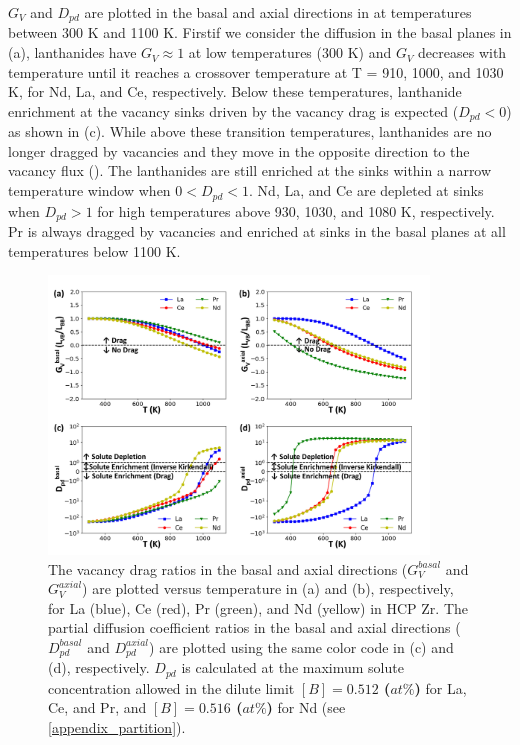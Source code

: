 \documentclass[preprint,12pt]{elsarticle}
\providecommand{\DIFadd}[1]{{\bf #1}} %
\providecommand{\DIFdel}[1]{} %
\providecommand{\DIFaddbegin}{\protect\color{blue}} %
\providecommand{\DIFaddend}{\protect\color{black}} %
\providecommand{\DIFdelbegin}{\protect\color{red}} %
\providecommand{\DIFdelend}{\protect\color{black}} %
\providecommand{\DIFaddFL}[1]{\DIFadd{#1}} %
\providecommand{\DIFdelFL}[1]{\DIFdel{#1}} %
\providecommand{\DIFaddbeginFL}{} %
\providecommand{\DIFaddendFL}{} %
\providecommand{\DIFdelbeginFL}{} %
\providecommand{\DIFdelendFL}{} %
\newcommand{\DIFscaledelfig}{0.5}
\newlength{\DIFdelgraphicswidth} %
\newlength{\DIFdelgraphicsheight} %
\newcommand{\DIFaddincludegraphics}[2][]{{\color{blue}\fbox{\DIFOincludegraphics[#1]{#2}}}} %
\newcommand{\DIFdelincludegraphics}[2][]{%
\sbox{\DIFdelgraphicsbox}{\DIFOincludegraphics[#1]{#2}}%
\settoboxwidth{\DIFdelgraphicswidth}{\DIFdelgraphicsbox} %
\settoboxtotalheight{\DIFdelgraphicsheight}{\DIFdelgraphicsbox} %
\scalebox{\DIFscaledelfig}{%
\parbox[b]{\DIFdelgraphicswidth}{\usebox{\DIFdelgraphicsbox}\\[-\baselineskip] \rule{\DIFdelgraphicswidth}{0em}}\llap{\resizebox{\DIFdelgraphicswidth}{\DIFdelgraphicsheight}{%
\setlength{\unitlength}{\DIFdelgraphicswidth}%
\begin{picture}(1,1)%
\thicklines\linethickness{2pt} %
{\color[rgb]{1,0,0}\put(0,0){\framebox(1,1){}}}%
{\color[rgb]{1,0,0}\put(0,0){\line( 1,1){1}}}%
{\color[rgb]{1,0,0}\put(0,1){\line(1,-1){1}}}%
\end{picture}%
}\hspace*{3pt}}} %
} %
\DeclareRobustCommand{\DIFaddbegin}{\DIFOaddbegin \let\includegraphics\DIFaddincludegraphics} %
\DeclareRobustCommand{\DIFaddend}{\DIFOaddend \let\includegraphics\DIFOincludegraphics} %
\DeclareRobustCommand{\DIFdelbegin}{\DIFOdelbegin \let\includegraphics\DIFdelincludegraphics} %
\DeclareRobustCommand{\DIFdelend}{\DIFOaddend \let\includegraphics\DIFOincludegraphics} %
\DeclareRobustCommand{\DIFaddbeginFL}{\DIFOaddbeginFL \let\includegraphics\DIFaddincludegraphics} %
\DeclareRobustCommand{\DIFaddendFL}{\DIFOaddendFL \let\includegraphics\DIFOincludegraphics} %
\DeclareRobustCommand{\DIFdelbeginFL}{\DIFOdelbeginFL \let\includegraphics\DIFdelincludegraphics} %
\DeclareRobustCommand{\DIFdelendFL}{\DIFOaddendFL \let\includegraphics\DIFOincludegraphics} %
\begin{document}
$G_V$ and $D_{pd}$ are plotted in the basal and axial directions in  at temperatures between 300 K and 1100 K. First\DIFaddbegin \DIFadd{, }\DIFaddend if we consider the diffusion in the basal planes in (a), lanthanides have $G_V \approx 1$ at low temperatures (300 K) and $G_V$ decreases with temperature until it reaches a crossover temperature at T = 910, 1000, and 1030 K, for Nd, La, and Ce, respectively. Below these temperatures, lanthanide enrichment at the vacancy sinks driven by the vacancy drag is expected ($D_{pd} < 0$) as shown in (c). While above these transition temperatures, lanthanides are no longer dragged by vacancies and they move in the opposite direction to the vacancy flux (\DIFdelbegin \DIFdel{IKE}\DIFdelend \DIFaddbegin \DIFadd{i.e., IKE takes place}\DIFaddend ). The lanthanides are still enriched at the sinks within a narrow temperature window when $ 0 < D_{pd} < 1$. Nd, La, and Ce are depleted at sinks when $ D_{pd} > 1$ for high temperatures above 930, 1030, and 1080 K, respectively.
Pr is always dragged by vacancies and enriched at sinks in the basal planes at all temperatures below 1100 K.



\begin{figure}[h!]
    \centering
    \DIFdelbeginFL %
\DIFdelendFL \DIFaddbeginFL \includegraphics[width=0.9\textwidth]{6_drag_pdc_basal_axial_updated.jpg}
    \DIFaddendFL \caption{The vacancy drag ratios in the basal and axial directions ($G_V^{basal}$ and $G_V^{axial}$) are plotted versus temperature in (a) and (b), respectively, for La (blue), Ce (red), Pr (green), and Nd (yellow) in HCP Zr. The partial diffusion coefficient ratios in the basal and axial directions ($D_{pd}^{basal}$ and $D_{pd}^{axial}$) are plotted using the same color code in (c) and (d), respectively. $D_{pd}$ is calculated at the maximum solute concentration allowed in the dilute limit \DIFdelbeginFL \DIFdelFL{$[B] = 0.256 \%$ }\DIFdelendFL \DIFaddbeginFL \DIFaddFL{$[B] = 0.512$ ($at\%$) }\DIFaddendFL for La, Ce, and Pr, and \DIFdelbeginFL \DIFdelFL{$[B] = 0.258 \%$ }\DIFdelendFL \DIFaddbeginFL \DIFaddFL{$[B] = 0.516$ ($at\%$) }\DIFaddendFL for Nd (see \ref{appendix_partition}).}
    \label{fig:drag_ratios}
\end{figure}
\end{document}
